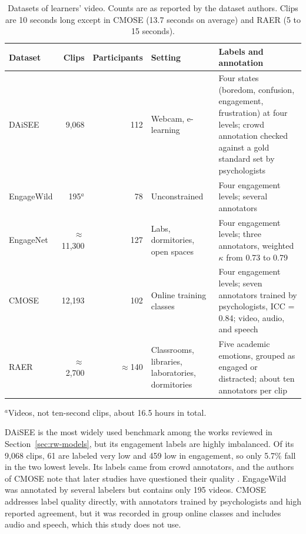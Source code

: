 \begin{table}[t]
   \centering
   \caption[Datasets of learners' video]{Datasets of learners' video. Counts are as reported by the dataset authors. Clips are 10 seconds long except in CMOSE (13.7 seconds on average) and RAER (5 to 15 seconds).}
   \label{tab:rw-datasets}
   \small
   \begin{tabular}{L{2.1cm}rrL{2.5cm}L{4.2cm}}
      \toprule
      Dataset & Clips & Participants & Setting & Labels and annotation \\
      \midrule
      DAiSEE \cite{gupta2016} & 9,068 & 112 & Webcam, e-learning & Four states (boredom, confusion, engagement, frustration) at four levels; crowd annotation checked against a gold standard set by psychologists \\
      EngageWild \cite{kaur2018} & 195$^{a}$ & 78 & Unconstrained & Four engagement levels; several annotators \\
      EngageNet \cite{singh2023} & $\approx$11,300 & 127 & Labs, dormitories, open spaces & Four engagement levels; three annotators, weighted $\kappa$ from 0.73 to 0.79 \\
      CMOSE \cite{wu2024cmose} & 12,193 & 102 & Online training classes & Four engagement levels; seven annotators trained by psychologists, ICC = 0.84; video, audio, and speech \\
      RAER \cite{zhao2025} & $\approx$2,700 & $\approx$140 & Classrooms, libraries, laboratories, dormitories & Five academic emotions, grouped as engaged or distracted; about ten annotators per clip \\
      \bottomrule
   \end{tabular}

   \vspace{0.5ex}
   {\footnotesize $^{a}$Videos, not ten-second clips, about 16.5 hours in total.\par}
\end{table}

DAiSEE \cite{gupta2016} is the most widely used benchmark among the works reviewed in Section~\ref{sec:rw-models}, but its engagement labels are highly imbalanced. Of its 9,068 clips, 61 are labeled very low and 459 low in engagement, so only 5.7\% fall in the two lowest levels. Its labels came from crowd annotators, and the authors of CMOSE note that later studies have questioned their quality \cite{wu2024cmose}. EngageWild \cite{kaur2018} was annotated by several labelers but contains only 195 videos. CMOSE \cite{wu2024cmose} addresses label quality directly, with annotators trained by psychologists and high reported agreement, but it was recorded in group online classes and includes audio and speech, which this study does not use.

